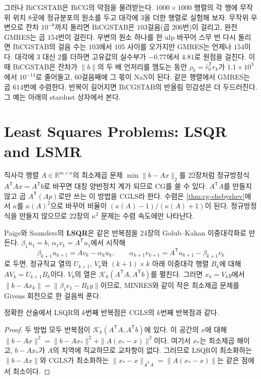 그러나 BiCGSTAB은 BiCG의 약점을 물려받는다. $1000\times1000$ 행렬의 각 행에 무작위 위치 $8$곳에 정규분포의 원소를 두고 대각에 $3$을 더한 행렬로 실험해 보자. 무작위 우변으로 잔차 $10^{-8}$까지 돌리면 BiCGSTAB은 $103$걸음(곱 $206$번)이 걸리고, 완전 GMRES는 곱 $154$번이 걸린다. 우변의 원소 하나를 한 ulp 바꾸어 스무 번 다시 돌리면 BiCGSTAB의 걸음 수는 $103$에서 $105$ 사이를 오가지만 GMRES는 언제나 $154$이다. 대각에 $3$ 대신 $2$를 더하면 고유값의 실수부가 $-0.77$에서 $4.81$로 원점을 걸친다. 이때 BiCGSTAB은 잔차가 $\|b\|$의 두 배 언저리를 맴도는 동안 $\rho_k=\hat r_0^{\mathsf T}r_k$가 $1.1\times10^3$에서 $10^{-14}$로 줄어들고, $60$걸음째에 그 몫이 NaN이 된다. 같은 행렬에서 GMRES는 곱 $614$번에 수렴한다. 반복이 길어지면 BiCGSTAB의 반올림 민감성은 더 두드러진다. 그 예는 아래의 stardust 상자에서 본다.

\section{Least Squares Problems: LSQR and LSMR}
\label{sec:lsqr}

직사각 행렬 $A\in\mathbb R^{m\times n}$의 최소제곱 문제 $\min\|b-Ax\|_2$를 22장처럼 정규방정식 $A^{\mathsf T}Ax=A^{\mathsf T}b$로 바꾸면 대칭 양반정치 계가 되므로 CG를 쓸 수 있다. $A^{\mathsf T}A$를 만들지 않고 곱 $A^{\mathsf T}(Ap)$로만 쓰는 이 방법을 CGLS라 한다. 수렴은 \cref{thm:cg-chebyshev}에서 $\kappa$를 $\kappa(A)^2$으로 바꾸어 비율이 $(\kappa(A)-1)/(\kappa(A)+1)$이 된다. 정규방정식을 만들지 않으므로 22장의 $\kappa^2$ 문제는 수렴 속도에만 나타난다.

Paige와 Saunders의 \textbf{LSQR}은 같은 반복점을 24장의 Golub--Kahan 이중대각화로 만든다\cite{paige1982lsqr,golub1965kahan}. $\beta_1u_1=b$, $\alpha_1v_1=A^{\mathsf T}u_1$에서 시작해
\[
\beta_{k+1}u_{k+1}=Av_k-\alpha_ku_k,\qquad\alpha_{k+1}v_{k+1}=A^{\mathsf T}u_{k+1}-\beta_{k+1}v_k
\]
로 두면, 정규직교 열의 $U_{k+1}$, $V_k$와 $(k+1)\times k$ 아래 이중대각 행렬 $B_k$에 대해 $AV_k=U_{k+1}B_k$이다. $V_k$의 열은 $\mathcal K_k(A^{\mathsf T}A,A^{\mathsf T}b)$를 펼친다. 그러면 $x_k=V_ky$에서 $\|b-Ax_k\|=\|\beta_1e_1-B_ky\|$이므로, MINRES와 같이 작은 최소제곱 문제를 Givens 회전으로 한 걸음씩 푼다.

\begin{proposition}
\label{prop:lsqr-cgls}
정확한 산술에서 LSQR의 $k$번째 반복점은 CGLS의 $k$번째 반복점과 같다.
\end{proposition}

\begin{proof}
두 방법 모두 반복점이 $\mathcal K_k(A^{\mathsf T}A,A^{\mathsf T}b)$에 있다. 이 공간의 $x$에 대해 $\|b-Ax\|^2=\|b-Ax_\ast\|^2+\|A(x_\ast-x)\|^2$이다. 여기서 $x_\ast$는 최소제곱 해이고, $b-Ax_\ast$가 $A$의 치역에 직교하므로 교차항이 없다. 그러므로 LSQR이 최소화하는 $\|b-Ax\|$와 CGLS가 최소화하는 $\|x_\ast-x\|_{A^{\mathsf T}A}=\|A(x_\ast-x)\|$는 같은 점에서 최소이다.
\end{proof}

